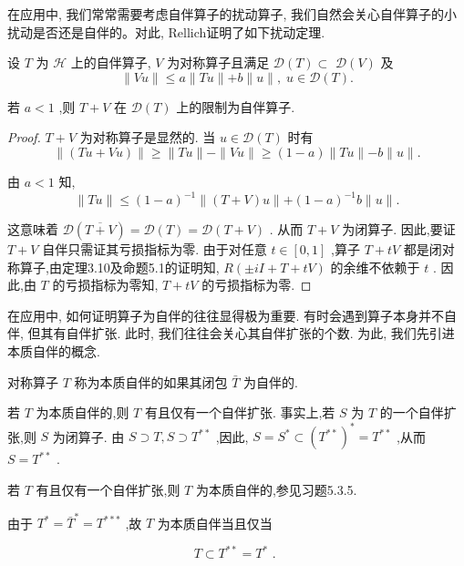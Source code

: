 \documentclass[lang=cn,newtx,10pt,scheme=chinese,thmcnt=chapter]{elegantbook}
\begin{document}
在应用中, 我们常常需要考虑自伴算子的扰动算子, 我们自然会关心自伴算子的小扰动是否还是自伴的。对此, Rellich证明了如下扰动定理.
\begin{theorem}[Rellich]
     设 \(T\) 为 \(\mathcal{H}\) 上的自伴算子, \(V\) 为对称算子且满足 \(\mathcal{D}(T)  \subset\)  \(\mathcal{D}\left( V\right)\) 及
\begin{equation*}
\parallel {Vu}\parallel  \leq  a\parallel {Tu}\parallel  + b\parallel u\parallel ,\;u \in  \mathcal{D}(T) . \label{5.20}
\end{equation*}

若 \(a < 1\) ,则 \(T + V\) 在 \(\mathcal{D}(T)\) 上的限制为自伴算子.

\end{theorem}
\begin{proof}
     \(T + V\) 为对称算子是显然的. 当 \(u \in  \mathcal{D}(T)\) 时有
\begin{equation*}
\parallel \left( {{Tu} + {Vu}}\right) \parallel  \geq  \parallel {Tu}\parallel  - \parallel {Vu}\parallel  \geq  \left( {1 - a}\right) \parallel {Tu}\parallel  - b\parallel u\parallel .
\end{equation*}

由 \(a < 1\) 知,
\begin{equation*}
\parallel {Tu}\parallel  \leq  {\left( 1 - a\right) }^{-1}\parallel \left( {T + V}\right) u\parallel  + {\left( 1 - a\right) }^{-1}b\parallel u\parallel .
\end{equation*}

这意味着 \(\mathcal{D}\left( \overline{T + V}\right)  = \mathcal{D}(T)  = \mathcal{D}\left( {T + V}\right)\) . 从而 \(T + V\) 为闭算子. 因此,要证 \(T + V\) 自伴只需证其亏损指标为零. 由于对任意 \(t \in  \left\lbrack  {0,1}\right\rbrack\) ,算子 \(T + {tV}\) 都是闭对称算子,由定理3.10及命题5.1的证明知, \(R\left( {\pm {iI} + T + {tV}}\right)\) 的余维不依赖于 \(t\) . 因此,由 \(T\) 的亏损指标为零知, \(T + {tV}\) 的亏损指标为零.
\end{proof}


在应用中, 如何证明算子为自伴的往往显得极为重要. 有时会遇到算子本身并不自伴, 但其有自伴扩张. 此时, 我们往往会关心其自伴扩张的个数. 为此, 我们先引进本质自伴的概念.
\begin{definition}
    对称算子 \(T\) 称为本质自伴的如果其闭包 \(\bar{T}\) 为自伴的.

\end{definition}
\begin{note}
 若 \(T\) 为本质自伴的,则 \(T\) 有且仅有一个自伴扩张. 事实上,若 \(S\) 为 \(T\) 的一个自伴扩张,则 \(S\) 为闭算子. 由 \(S \supset  T,S \supset  {T}^{* * }\) ,因此, \(S = {S}^{ * } \subset  {\left( {T}^{* * }\right) }^{ * } = {T}^{* * }\) ,从而 \(S = {T}^{* * }\) .

若 \(T\) 有且仅有一个自伴扩张,则 \(T\) 为本质自伴的,参见习题5.3.5.

由于 \({T}^{ * } = {\bar{T}}^{ * } = {T}^{* *  * }\) ,故 \(T\) 为本质自伴当且仅当

\begin{equation*}
T \subset  {T}^{* * } = {T}^{ * }\text{ . }
\end{equation*}

\end{note}
\end{document}
